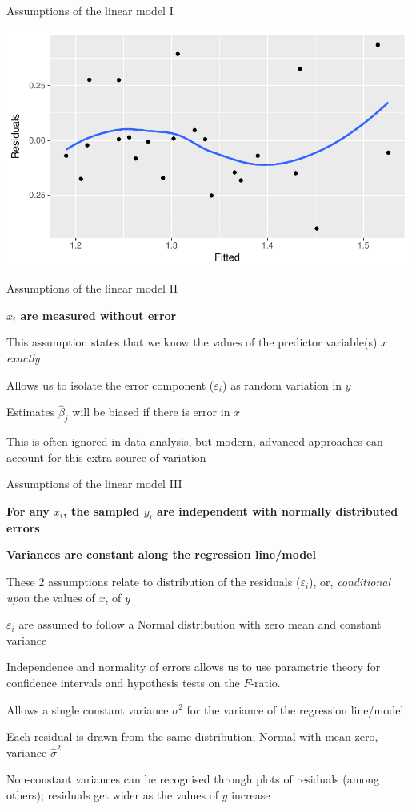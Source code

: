 \documentclass[10pt,ignorenonframetext,compress, aspectratio=169]{beamer}
\begin{document}
\begin{frame}{Assumptions of the linear model I}

\begin{center}\includegraphics[width=0.7\linewidth]{03-linear-models_files/figure-beamer/resid-vs-fitted-1} \end{center}

\end{frame}

\begin{frame}{Assumptions of the linear model II}

\textbf{\(x_i\) are measured without error}

This assumption states that we know the values of the predictor
variable(s) \(x\) \emph{exactly}

Allows us to isolate the error component (\(\varepsilon_i\)) as random
variation in \(y\)

Estimates \(\hat{\beta}_j\) will be biased if there is error in \(x\)

This is often ignored in data analysis, but modern, advanced approaches
can account for this extra source of variation

\end{frame}

\begin{frame}{Assumptions of the linear model III}

\textbf{For any \(x_i\), the sampled \(y_i\) are \alert{independent}
with normally distributed errors}

\textbf{Variances are constant along the regression line/model}

These 2 assumptions relate to distribution of the residuals
(\(\varepsilon_i\)), or, \emph{conditional upon} the values of \(x\), of
\(y\)

\(\varepsilon_i\) are assumed to follow a \alert{Normal} distribution
with zero mean and constant variance

Independence and normality of errors allows us to use parametric theory
for confidence intervals and hypothesis tests on the \(F\)-ratio.

Allows a single constant variance \(\sigma^2\) for the variance of the
regression line/model

Each residual is drawn from the same distribution; Normal with mean
zero, variance \(\hat{\sigma}^2\)

Non-constant variances can be recognised through plots of residuals
(among others); residuals get wider as the values of \(y\) increase

\end{frame}
\end{document}
